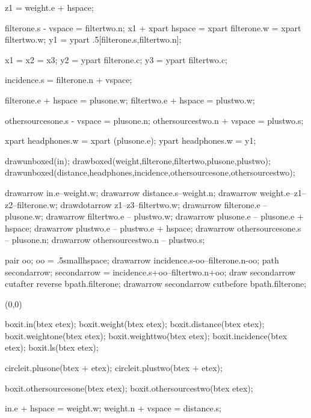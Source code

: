 \documentclass[a4paper]{article}
\begin{document}
\begin{empfile}
\begin{empdef}[binaural2]
z1 = weight.e + hspace;

filterone.s - vspace = filtertwo.n;
x1 + xpart hspace = xpart filterone.w = xpart filtertwo.w;
y1 = ypart .5[filterone.s,filtertwo.n];

x1 = x2 = x3;
y2 = ypart filterone.c;
y3 = ypart filtertwo.c;

incidence.s = filterone.n + vspace;

filterone.e + hspace = plusone.w;
filtertwo.e + hspace = plustwo.w;

othersourcesone.s - vspace = plusone.n;
othersourcestwo.n + vspace = plustwo.s;

xpart headphones.w = xpart (plusone.e);
ypart headphones.w = y1;

drawunboxed(in);
drawboxed(weight,filterone,filtertwo,plusone,plustwo);
drawunboxed(distance,headphones,incidence,othersourcesone,othersourcestwo);

drawarrow in.e--weight.w;
drawarrow distance.s--weight.n;
drawarrow weight.e--z1--z2--filterone.w;
drawdotarrow z1--z3--filtertwo.w;
drawarrow filterone.e -- plusone.w;
drawarrow filtertwo.e -- plustwo.w;
drawarrow plusone.e -- plusone.e + hspace;
drawarrow plustwo.e -- plustwo.e + hspace;
drawarrow othersourcesone.s -- plusone.n;
drawarrow othersourcestwo.n -- plustwo.s;

pair oo;
oo = .5smallhspace;
drawarrow incidence.s-oo--filterone.n-oo;
path secondarrow;
secondarrow = incidence.s+oo--filtertwo.n+oo;
draw secondarrow cutafter reverse bpath.filterone;
drawarrow secondarrow cutbefore bpath.filterone;

\end{empdef}

\begin{empdef}[vbap2](0,0)

boxit.in(btex  etex);
boxit.weight(btex  etex);
boxit.distance(btex  etex);
boxit.weightone(btex  etex);
boxit.weighttwo(btex  etex);
boxit.incidence(btex  etex);
boxit.ls(btex  etex);

circleit.plusone(btex $+$ etex);
circleit.plustwo(btex $+$ etex);

boxit.othersourcesone(btex  etex);
boxit.othersourcestwo(btex  etex);

in.e + hspace = weight.w;
weight.n + vspace = distance.s;


\end{empdef}
\end{empfile}
\end{document}
